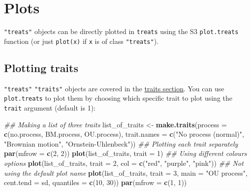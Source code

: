 \documentclass[
]{book}
\newenvironment{Shaded}{\begin{snugshade}}{\end{snugshade}}
\newcommand{\CommentTok}[1]{\textcolor[rgb]{0.56,0.35,0.01}{\textit{#1}}}
\newcommand{\DataTypeTok}[1]{\textcolor[rgb]{0.13,0.29,0.53}{#1}}
\newcommand{\DecValTok}[1]{\textcolor[rgb]{0.00,0.00,0.81}{#1}}
\newcommand{\KeywordTok}[1]{\textcolor[rgb]{0.13,0.29,0.53}{\textbf{#1}}}
\newcommand{\NormalTok}[1]{#1}
\newcommand{\StringTok}[1]{\textcolor[rgb]{0.31,0.60,0.02}{#1}}
\begin{document}
\hypertarget{plots}{%
\chapter{Plots}\label{plots}}

\texttt{"treats"} objects can be directly plotted in \texttt{treats} using the S3 \texttt{plot.treats} function (or just \texttt{plot(x)} if \texttt{x} is of class \texttt{"treats"}).

\hypertarget{plotting-traits}{%
\section{Plotting traits}\label{plotting-traits}}

\texttt{"treats"} \texttt{"traits"} objects are covered in the \protect\hyperlink{maketraits}{traits section}.
You can use \texttt{plot.treats} to plot them by choosing which specific trait to plot using the \texttt{trait} argument (default is 1):

\begin{Shaded}
\begin{Highlighting}[]
\CommentTok{\#\# Making a list of three traits}
\NormalTok{list\_of\_traits \textless{}{-}}\StringTok{ }\KeywordTok{make.traits}\NormalTok{(}\DataTypeTok{process =} \KeywordTok{c}\NormalTok{(no.process, BM.process, OU.process),}
                              \DataTypeTok{trait.names =} \KeywordTok{c}\NormalTok{(}\StringTok{"No process (normal)"}\NormalTok{, }\StringTok{"Brownian motion"}\NormalTok{, }\StringTok{"Ornstein{-}Uhlenbeck"}\NormalTok{))}
\CommentTok{\#\# Plotting each trait separately}
\KeywordTok{par}\NormalTok{(}\DataTypeTok{mfrow =} \KeywordTok{c}\NormalTok{(}\DecValTok{2}\NormalTok{, }\DecValTok{2}\NormalTok{))}
\KeywordTok{plot}\NormalTok{(list\_of\_traits, }\DataTypeTok{trait =} \DecValTok{1}\NormalTok{)}
\CommentTok{\#\# Using different colours options}
\KeywordTok{plot}\NormalTok{(list\_of\_traits, }\DataTypeTok{trait =} \DecValTok{2}\NormalTok{, }\DataTypeTok{col =} \KeywordTok{c}\NormalTok{(}\StringTok{"red"}\NormalTok{, }\StringTok{"purple"}\NormalTok{, }\StringTok{"pink"}\NormalTok{))}
\CommentTok{\#\# Not using the default plot name}
\KeywordTok{plot}\NormalTok{(list\_of\_traits, }\DataTypeTok{trait =} \DecValTok{3}\NormalTok{, }\DataTypeTok{main =} \StringTok{"OU process"}\NormalTok{,}
     \DataTypeTok{cent.tend =}\NormalTok{ sd, }\DataTypeTok{quantiles =} \KeywordTok{c}\NormalTok{(}\DecValTok{10}\NormalTok{, }\DecValTok{30}\NormalTok{))}
\KeywordTok{par}\NormalTok{(}\DataTypeTok{mfrow =} \KeywordTok{c}\NormalTok{(}\DecValTok{1}\NormalTok{, }\DecValTok{1}\NormalTok{))}
\end{Highlighting}
\end{Shaded}
\end{document}
